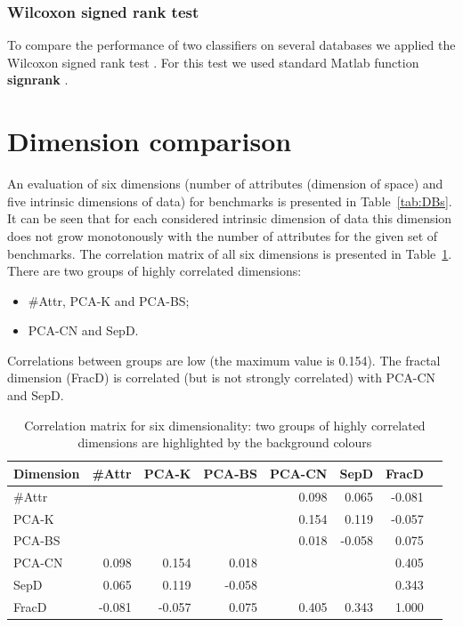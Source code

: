 \documentclass[entropy,article,submit,moreauthors,pdftex]{Definitions/mdpi}
\begin{document}
\subsubsection{Wilcoxon signed rank test}
To compare the performance of two classifiers on several databases we applied the Wilcoxon signed rank test \cite{wilcoxon1945individual}. For this test we used standard Matlab function \textbf{signrank} \cite{matlabWilcoxon}.

\section{Dimension comparison}\label{DimComp}

An evaluation of six dimensions (number of attributes (dimension of space) and five intrinsic dimensions of data) for benchmarks is presented in Table~\ref{tab:DBs}. It can be seen that for each considered intrinsic dimension of data this dimension does not grow monotonously with the number of attributes for the given set of benchmarks. The correlation matrix of all six dimensions is presented in Table~\ref{tab:CorrDist}. There are two groups of highly correlated dimensions:
\begin{itemize}
\item \#Attr, PCA-K and PCA-BS;
\item PCA-CN and SepD.
\end{itemize}
Correlations between groups are low (the maximum value is 0.154). The fractal dimension (FracD) is correlated (but is not strongly correlated) with PCA-CN and SepD.

\begin{table}[b]
\caption{Correlation matrix for six dimensionality: two groups of highly correlated dimensions are highlighted by the background colours}
\centering
\begin{tabular}{|l|r|r|r|r|r|r|r|}
\hline
\textbf{Dimension}&\textbf{\#Attr}&\textbf{PCA-K}&\textbf{PCA-BS}&\textbf{PCA-CN}&\textbf{SepD}&\textbf{FracD}\\\hline

\#Attr&\cellcolor{blue!30}{1.000}&\cellcolor{blue!30}{0.998}&\cellcolor{blue!30}{0.923}&0.098&0.065&-0.081\\ \hline
PCA-K&\cellcolor{blue!30}{0.998}&\cellcolor{blue!30}{1.000}&\cellcolor{blue!30}{0.917}&0.154&0.119&-0.057\\ \hline
PCA-BS&\cellcolor{blue!30}{0.923}&\cellcolor{blue!30}{0.917}&\cellcolor{blue!30}{1.000}&0.018&-0.058&0.075\\ \hline
PCA-CN&0.098&0.154&0.018&\cellcolor{green!30}{1.000}&\cellcolor{green!30}{0.992}&0.405\\ \hline
SepD&0.065&0.119&-0.058&\cellcolor{green!30}{0.992}&\cellcolor{green!30}{1.000}&0.343\\ \hline
FracD&-0.081&-0.057&0.075&0.405&0.343&1.000\\ \hline

\end{tabular}
\label{tab:CorrDist}
\end{table}
\end{document}
